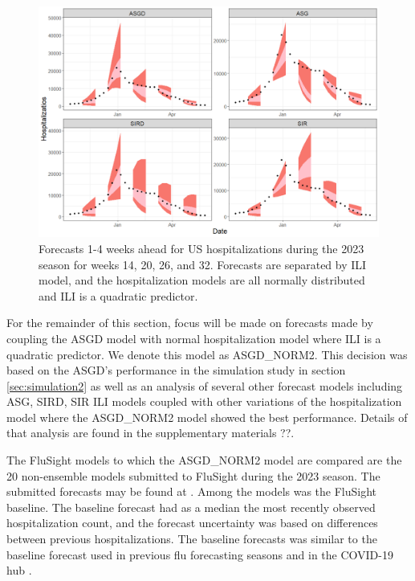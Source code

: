 \begin{figure}[hbt!]

  \centering
  \begin{adjustwidth}{-1cm}{-1.9cm}
  \includegraphics[scale=.45]{Images/normal_sq_forecasts_us.png}
  \end{adjustwidth}
\caption{Forecasts 1-4 weeks ahead for US hospitalizations during the 2023 
season for weeks 14, 20, 26, and 32. Forecasts are separated by ILI model, 
and the hospitalization models are all normally distributed and ILI is a 
quadratic predictor.}
\label{fig:normal_flu_forecasts}
\end{figure}

For the
remainder of this section, focus will be made on forecasts made by coupling the
ASGD model with normal hospitalization model where ILI is a quadratic predictor.
We denote this model as ASGD\_NORM2. 
This decision was based on the ASGD's performance in the simulation study in 
section \ref{sec:simulation2} as well as an analysis of several other forecast
models including ASG, SIRD, SIR ILI models coupled with other variations of the
hospitalization model where the ASGD\_NORM2 model showed the best performance.
Details
of that analysis are found in the supplementary materials ??. 

The FluSight 
models to which the ASGD\_NORM2 model are compared are the 
20 non-ensemble models
submitted to FluSight during the 2023 season.
The submitted forecasts may be found at \cite{mathis2023flusight}.
Among the models
was the FluSight baseline. The baseline forecast had as a median the most 
recently observed 
hospitalization count, and the forecast uncertainty was based on 
differences between 
previous hospitalizations. The baseline forecasts was
similar to the baseline forecast used in
previous flu forecasting seasons and in the COVID-19 hub 
\cite[]{mathis2024evaluation, Cramer2022-hub-dataset}.

